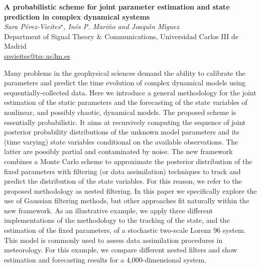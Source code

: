 \documentclass[12pt]{article}
\newcommand{\postertitle}[1]{{\Large\bf #1}\\[12pt]}
\newcommand{\authors}[1]{\emph{#1}\\}
\newcommand{\affiliations}[1]{{#1}\\}
\newcommand{\contacts}[1]{{#1}}
\begin{document}
\begin{center}
\vspace*{0.5cm}
%
\postertitle{A probabilistic scheme for joint parameter estimation and state prediction in complex dynamical systems}
%
\authors{Sara P\'erez-Vieites$^\star$, In\'es P. Mari\~no and Joaqu\'{\i}n M\'{\i}guez} %
% 
\affiliations{Department of Signal Theory \& Communications, Universidad Carlos III de Madrid}
%
\contacts{\url{spvieites@tsc.uc3m.es}} %
%
\vspace*{0.3cm}
\end{center}

Many problems in the geophysical sciences demand the ability to calibrate the parameters and predict the time evolution of complex dynamical models using sequentially-collected data. Here we introduce a general methodology for the joint estimation of the static parameters and the forecasting of the state variables of nonlinear, and possibly chaotic, dynamical models. The proposed scheme is essentially probabilistic. It aims at recursively computing the sequence of joint posterior probability distributions of the unknown model parameters and its (time varying) state variables conditional on the available observations. The latter are possibly partial and contaminated by noise. The new framework combines a Monte Carlo scheme to approximate the posterior distribution of the fixed parameters with filtering (or data assimilation) techniques to track and predict the distribution of the state variables. For this reason, we refer to the proposed methodology as nested filtering. In this paper we specifically explore the use of Gaussian filtering methods, but other approaches fit naturally within the new framework. As an illustrative example, we apply three different implementations of the methodology to the tracking of the state, and the estimation of the fixed parameters, of a stochastic two-scale Lorenz 96 system. This model is commonly used to assess data assimilation procedures in meteorology. For this example, we compare different nested filters and show estimation and forecasting results for a 4,000-dimensional system.

%
%
\end{document}
